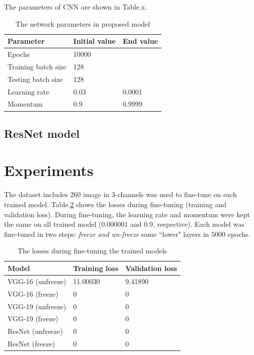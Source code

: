 \documentclass[12pt,a4paper]{article}
\begin{document}
The parameters of CNN are shown in Table.x.
\begin{table}[h!]
	\centering
	\begin{tabular}{l l l}
	Parameter & Initial value & End value \\ \hline
	Epochs & 10000 &  \\ \hline
	Training batch size & 128 & \\ \hline
	Testing batch size & 128 & \\ \hline
	Learning rate & 0.03 & 0.0001 \\ \hline
	Momentum & 0.9 & 0.9999 \\ \hline
	\end{tabular}
	\caption{The network parameters in proposed model}
	\label{model2parameters}
\end{table}
\subsection{ResNet model}
\section{Experiments}
The dataset includes 260 image in 3-channels was used to fine-tune on each trained model. Table.\ref{result} shows the losses during fine-tuning (training and validation loss). During fine-tuning, the learning rate and momentum were kept the same on all trained model ($0.000001$ and $0.9$, respective). Each model was fine-tuned in two steps: \textit{freeze and un-freeze} some ``lower" layers in $5000$ epochs.

\begin{table}[h!]
	\centering
	\begin{tabular}{l l l}
	Model & Training loss & Validation loss \\ \hline
	VGG-16 (unfreeze) & 11.00030 & 9.41890  \\ \hline
	VGG-16 (freeze) & 0 & 0 \\ \hline
	VGG-19 (unfreeze) & 0 & 0 \\ \hline
	VGG-19 (freeze) & 0 & 0 \\ \hline
	ResNet (unfreeze) & 0 & 0 \\ \hline
	ResNet (freeze) & 0 & 0 \\ \hline
	\end{tabular}
	\caption{The losses during fine-tuning the trained models}
	\label{result}
\end{table}
\end{document}
